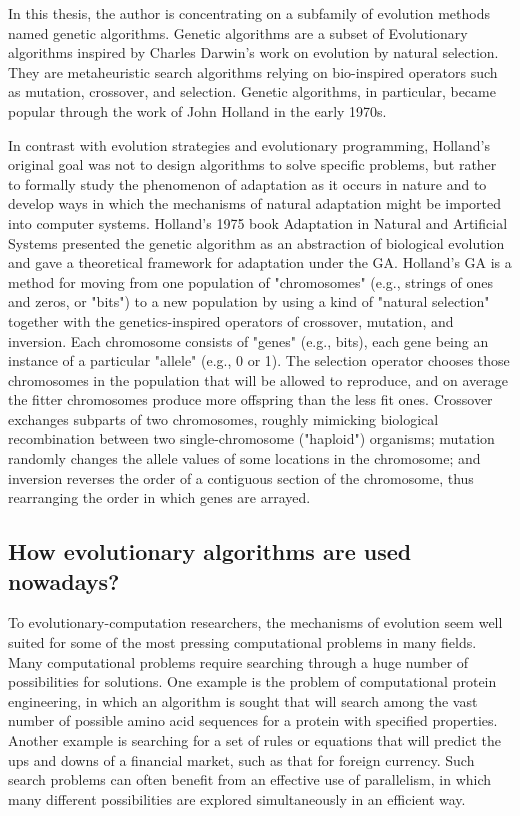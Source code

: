 In this thesis, the author is concentrating on a subfamily of evolution methods named genetic algorithms. Genetic algorithms are a subset of Evolutionary algorithms inspired by Charles Darwin's work on evolution by natural selection. They are metaheuristic search algorithms relying on bio-inspired operators such as mutation, crossover, and selection. Genetic algorithms, in particular, became popular through the work of John Holland in the early 1970s.

In contrast with evolution strategies and evolutionary programming, Holland's original goal was not to design algorithms to solve specific problems, but rather to formally study the phenomenon of adaptation as it occurs in nature and to develop ways in which the mechanisms of natural adaptation might be imported into computer systems. Holland's 1975 book Adaptation in Natural and Artificial Systems presented the genetic algorithm as an abstraction of biological evolution and gave a theoretical framework for adaptation under the GA. Holland's GA is a method for moving from one population of "chromosomes" (e.g., strings of ones and zeros, or "bits") to a new population by using a kind of "natural selection" together with the genetics-inspired operators of crossover, mutation, and inversion. Each chromosome consists of "genes" (e.g., bits), each gene being an instance of a particular "allele" (e.g., 0 or 1). The selection operator chooses those chromosomes in the population that will be allowed to reproduce, and on average the fitter chromosomes produce more offspring than the less fit ones. Crossover exchanges subparts of two chromosomes, roughly mimicking biological recombination between two single-chromosome ("haploid") organisms; mutation randomly changes the allele values of some locations in the chromosome; and inversion reverses the order of a contiguous section of the chromosome, thus rearranging the order in which genes are arrayed. \cite{introduction_to_ga} 

\subsection{How evolutionary algorithms are used nowadays?}
 
To evolutionary-computation researchers, the mechanisms of evolution seem well suited for some of the most pressing computational problems in many fields. Many computational problems require searching through a huge number of possibilities for solutions. One example is the problem of computational protein engineering, in which an algorithm is sought that will search among the vast number of possible amino acid sequences for a protein with specified properties. Another example is searching for a set of rules or equations that will predict the ups and downs of a financial market, such as that for foreign currency. Such search problems can often benefit from an effective use of parallelism, in which many different possibilities are explored simultaneously in an efficient way. \cite{introduction_to_ga}

